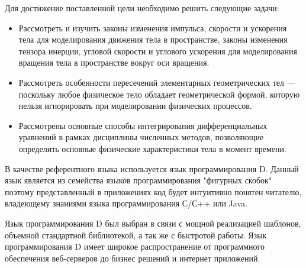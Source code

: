 Для достижение поставленной цели необходимо решить следующие задачи:
\begin{itemize}
  \item Рассмотреть и изучить законы изменения импульса, скорости и ускорения тела для моделирования
  движения тела в пространстве, законы изменения тензора инерции, угловой скорости и углового ускорения 
  для моделирования вращения тела в пространстве вокруг оси вращения.

  \item Рассмотреть особенности пересечений элементарных геометрических тел --- поскольку любое физическое тело обладает 
  геометрической формой, которую нельзя игнорировать при моделировании физических процессов.

  \item Рассмотрены основные способы интегрирования дифференциальных уравнений в рамках дисциплины численных методов, 
  позволяющие определить основные физические характеристики тела в момент времени.
\end{itemize}


В качестве референтного языка используется язык программирования D.
Данный язык является из семейства языков программирования "фигурных скобок"
поэтому представленный в приложениях код будет интуитивно понятен читателю,
владеющему знаниями языка программирования С/С++ или Java.

Язык программирования D был выбран в связи с мощной реализацией шаблонов,
объемной стандартной библиотекой, а так же с быстротой работы.
Язык программирования D имеет широкое распространение от программного обеспечения веб-серверов
до бизнес решений и интернет приложений.